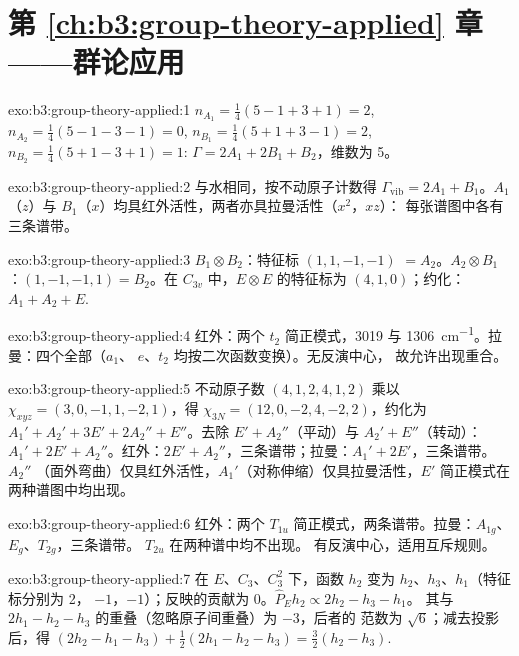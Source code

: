 \section*{第 \ref{ch:b3:group-theory-applied} 章——群论应用}

\begin{solution}{exo:b3:group-theory-applied:1}
$n_{A_1} = \frac14(5 - 1 + 3 + 1) = 2$, $n_{A_2} = \frac14(5 - 1 - 3 - 1) = 0$,
$n_{B_1} = \frac14(5 + 1 + 3 - 1) = 2$, $n_{B_2} = \frac14(5 + 1 - 3 + 1) = 1$:
$\Gamma = 2A_1 + 2B_1 + B_2$，维数为 5。
\end{solution}

\begin{solution}{exo:b3:group-theory-applied:2}
与水相同，按不动原子计数得 $\Gamma_{\mathrm{vib}} = 2A_1 + B_1$。$A_1$（$z$）与
$B_1$（$x$）均具红外活性，两者亦具拉曼活性（$x^2$，$xz$）：
每张谱图中各有三条谱带。
\end{solution}

\begin{solution}{exo:b3:group-theory-applied:3}
$B_1\otimes B_2$：特征标 $(1, 1, -1, -1)$ $= A_2$。$A_2\otimes B_1$：$(1, -1, -1,
1) = B_2$。在 $C_{3v}$ 中，$E\otimes E$ 的特征标为 $(4, 1, 0)$；约化：$A_1 + A_2 +
E$.
\end{solution}

\begin{solution}{exo:b3:group-theory-applied:4}
红外：两个 $t_2$ 简正模式，3019 与 \qty{1306}{cm^{-1}}。拉曼：四个全部（$a_1$、
$e$、$t_2$ 均按二次函数变换）。无反演中心，
故允许出现重合。
\end{solution}

\begin{solution}{exo:b3:group-theory-applied:5}
不动原子数 $(4, 1, 2, 4, 1, 2)$ 乘以 $\chi_{xyz} = (3, 0, -1, 1, -2, 1)$，得
$\chi_{3N} = (12, 0, -2, 4, -2, 2)$，约化为 $A_1' + A_2' + 3E' + 2A_2'' +
E''$。去除 $E' + A_2''$（平动）与 $A_2' + E''$（转动）：$A_1' + 2E'
+ A_2''$。红外：$2E' + A_2''$，三条谱带；拉曼：$A_1' + 2E'$，三条谱带。$A_2''$
（面外弯曲）仅具红外活性，$A_1'$（对称伸缩）仅具拉曼活性，$E'$
简正模式在两种谱图中均出现。
\end{solution}

\begin{solution}{exo:b3:group-theory-applied:6}
红外：两个 $T_{1u}$ 简正模式，两条谱带。拉曼：$A_{1g}$、$E_g$、$T_{2g}$，三条谱带。
$T_{2u}$ 在两种谱中均不出现。 有反演中心，适用互斥规则。
\end{solution}

\begin{solution}{exo:b3:group-theory-applied:7}
在 $E$、$C_3$、$C_3^2$ 下，函数 $h_2$ 变为 $h_2$、$h_3$、$h_1$（特征标分别为 2，
$-1$，$-1$）；反映的贡献为 0。$\hat P_Eh_2 \propto 2h_2 - h_3 - h_1$。
其与 $2h_1 - h_2 - h_3$ 的重叠（忽略原子间重叠）为 $-3$，后者的
范数为 $\sqrt6$；减去投影后，得 $(2h_2 - h_1 - h_3) +
\frac12(2h_1 - h_2 - h_3) = \frac32(h_2 - h_3)$.
\end{solution}


